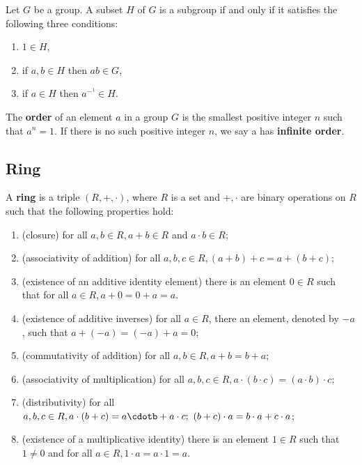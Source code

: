 \documentclass[12pt]{book}
\begin{document}
\begin{lem}\label{lem:sizefiniteset}
      Let $G$ be a group. A subset $H$ of $G$ is a subgroup if and only if it satisfies the following three conditions:
      \begin{enumerate}
	        \item $1 \in H$,
		 	\item if $a, b \in H$ then $ab \in G$,
		 	\item if $a \in H$ then $a^-^1 \in H$.
	   \end{enumerate}
\end{lem}
	 
\begin{defi}\label{def:group4}
      The \textbf{order} of an element $a$ in a group $G$ is the smallest positive integer $n$ such that $a^n =1$. If there is no 
	  such positive integer $n$, we say a has \textbf{infinite order}.
\end{defi}
\subsection{Ring}
\label{sec:Ring}

\begin{defi}\label{def:ring1}
      A \textbf{ring} is a triple $(R,+, \cdot)$, where $R$ is a set and $+, \cdot$ are binary operations on $R$ such that the following properties hold:
      \begin{enumerate}
	         \item (closure) for all $a, b \in R, a + b \in R$ and $a \cdot b \in R$;
			 \item (associativity of addition) for all $a, b, c \in R, (a+b) +c = a +(b+c)$;
			 \item (existence of an additive identity element) there is an element $0 \in R$ such that for all $a \in R, a + 0 = 0 + a = a$.
			 \item (existence of additive inverses) for all $a \in R$, there an element, denoted by $-a$, such that $a +(-a) = (-a)+ a = 0$;
			 \item (commutativity of addition) for all $a, b \in R, a + b = b +a$;
			 \item (associativity of multiplication) for all $a, b, c \in R, a \cdot (b \cdot c) = (a \cdot b) \cdot c$;
			 \item (distributivity) for all $a, b, c \in R, a \cdot (b + c) = a \cdotb + a \cdot c; \ (b + c) \cdot a = b \cdot a + c \cdot a$;
			 \item (existence of a multiplicative identity) there is an element $1 \in R$ such that $1 \not = 0$ and for all $a \in R, 1 \cdot a = a \cdot 1 = a$.
	  \end{enumerate}
\end{defi}
\end{document}
